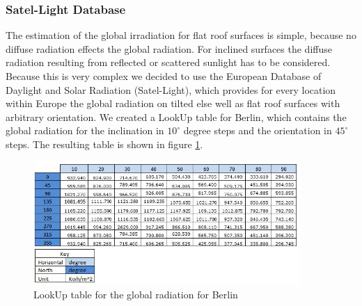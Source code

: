 \subsubsection{Satel-Light Database}
The estimation of the global irradiation for flat roof surfaces is simple, because no diffuse radiation effects the global radiation. For inclined surfaces the diffuse radiation resulting from reflected or scattered sunlight has to be considered. Because this is very complex we decided to use the European Database of Daylight and Solar Radiation (Satel-Light), which provides for every location within Europe the global radiation on tilted else well as flat roof surfaces with arbitrary orientation. We created a LookUp table for Berlin, which contains the global radiation for the inclination in \(10^\circ\) degree steps and the orientation in \(45^\circ\) steps. The resulting table is shown in figure \ref{fig:rad_table}.

\begin{figure}[hbt!]
\centering
\includegraphics[width=0.9\textwidth]{phase2/group2/figure/table_global_radiation.png}
\caption{LookUp table for the global radiation for Berlin}
\label{fig:rad_table}
\end{figure}